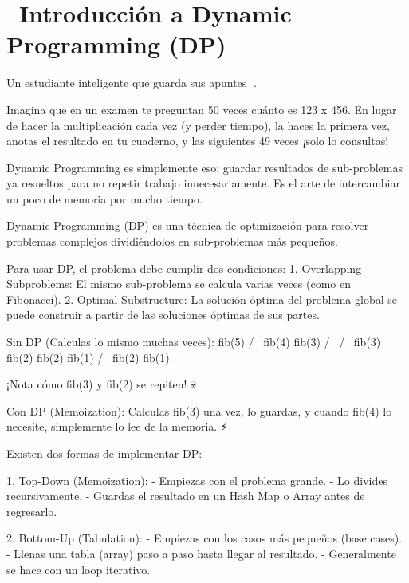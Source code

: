 ﻿\chapter[\emj{🧩}~Introducción a Dynamic Programming (DP)]{~Introducción a Dynamic Programming (DP)}

\begin{dsaquees}
Un estudiante inteligente que guarda sus apuntes 📒. 

Imagina que en un examen te preguntan 50 veces cuánto es 123 x 456.
En lugar de hacer la multiplicación cada vez (y perder tiempo),
la haces la primera vez, anotas el resultado en tu cuaderno, y 
las siguientes 49 veces ¡solo lo consultas!

Dynamic Programming es simplemente eso: guardar resultados de 
sub-problemas ya resueltos para no repetir trabajo innecesariamente. 
Es el arte de intercambiar un poco de memoria por mucho tiempo.
\end{dsaquees}
\begin{dsaotraforma}
Dynamic Programming (DP) es una técnica de optimización para resolver
problemas complejos dividiéndolos en sub-problemas más pequeños. 

Para usar DP, el problema debe cumplir dos condiciones:
1. Overlapping Subproblems: El mismo sub-problema se calcula varias
   veces (como en Fibonacci).
2. Optimal Substructure: La solución óptima del problema global se
   puede construir a partir de las soluciones óptimas de sus partes.
\end{dsaotraforma}
\begin{dsadiagrama}
Sin DP (Calculas lo mismo muchas veces):
             fib(5)
           /        \
      fib(4)         fib(3)
      /    \        /      \
  fib(3)  fib(2)  fib(2)  fib(1)
  /    \
fib(2) fib(1)

¡Nota cómo fib(3) y fib(2) se repiten! 💀

Con DP (Memoization):
Calculas fib(3) una vez, lo guardas, y cuando fib(4) lo necesite,
simplemente lo lee de la memoria. ⚡
\end{dsadiagrama}
\begin{dsacomofunciona}
Existen dos formas de implementar DP:

1. Top-Down (Memoization):
   - Empiezas con el problema grande.
   - Lo divides recursivamente.
   - Guardas el resultado en un Hash Map o Array antes de regresarlo.

2. Bottom-Up (Tabulation):
   - Empiezas con los casos más pequeños (base cases).
   - Llenas una tabla (array) paso a paso hasta llegar al resultado.
   - Generalmente se hace con un loop iterativo.
\end{dsacomofunciona}
